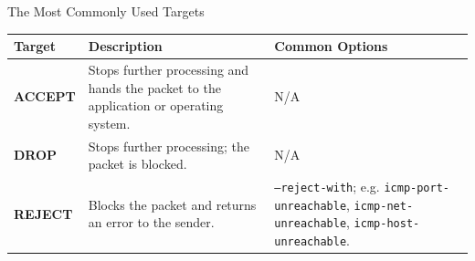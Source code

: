 \begin{frame}{The Most Commonly Used Targets}
\centering\fontsize{11.5}{13.5}\selectfont
\renewcommand{\arraystretch}{1.3}
\begin{tabular}{|Y{2cm}|Y{6.3cm}|Y{4.2cm}|}\hline
{}\color{white}\bfseries Target&\color{white}\bfseries Description&\color{white}\bfseries Common Options\\\hline
\textcolor{WarningColor}{\bfseries ACCEPT}&Stops further processing and hands the packet to the application or operating system.&N/A\\\hline
\textcolor{WarningColor}{\bfseries DROP}&Stops further processing; the packet is blocked.&N/A\\\hline
\textcolor{WarningColor}{\bfseries REJECT}&Blocks the packet and returns an error to the sender.&\texttt{--reject-with}; e.g. \texttt{icmp-port-unreachable}, \texttt{icmp-net-unreachable}, \texttt{icmp-host-unreachable}.\\\hline
\end{tabular}
\end{frame}
